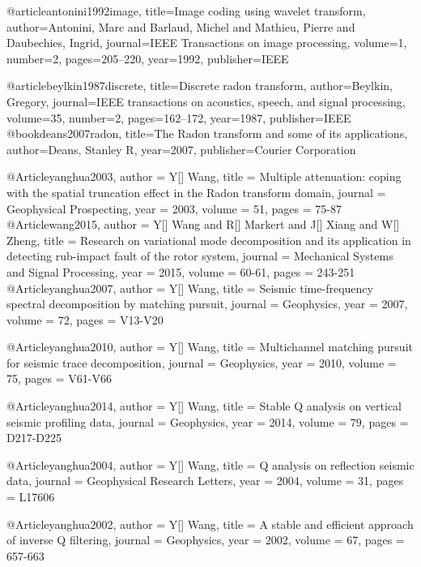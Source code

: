 @article{antonini1992image,
  title={Image coding using wavelet transform},
  author={Antonini, Marc and Barlaud, Michel and Mathieu, Pierre and Daubechies, Ingrid},
  journal={IEEE Transactions on image processing},
  volume={1},
  number={2},
  pages={205--220},
  year={1992},
  publisher={IEEE}
}

@article{beylkin1987discrete,
  title={Discrete radon transform},
  author={Beylkin, Gregory},
  journal={IEEE transactions on acoustics, speech, and signal processing},
  volume={35},
  number={2},
  pages={162--172},
  year={1987},
  publisher={IEEE}
}
@book{deans2007radon,
  title={The Radon transform and some of its applications},
  author={Deans, Stanley R},
  year={2007},
  publisher={Courier Corporation}
}

@Article{yanghua2003,
  author = 	 {Y[] Wang},
  title = 	 {Multiple attenuation: coping with the spatial truncation effect in the Radon transform domain},
  journal = 	 {Geophysical Prospecting},
  year = 	 2003,
  volume =	 51,
  pages =	 {75-87}
}
@Article{wang2015,
  author = 	 {Y[] Wang and R[] Markert and J[] Xiang and W[] Zheng},
  title = 	 {Research on variational mode decomposition and its application in detecting rub-impact fault of the rotor system},
  journal = 	 {Mechanical Systems and Signal Processing},
  year = 	 2015,
  volume =	 60-61,
  pages =	 {243-251}
}
@Article{yanghua2007,
  author = 	 {Y[] Wang},
  title = 	 {Seismic time-frequency spectral decomposition by matching pursuit},
  journal = 	 {Geophysics},
  year = 	 2007,
  volume =	 72,
  pages =	 {V13-V20}
}

@Article{yanghua2010,
  author = 	 {Y[] Wang},
  title = 	 {Multichannel matching pursuit for seismic trace decomposition},
  journal = 	 {Geophysics},
  year = 	 2010,
  volume =	 75,
  pages =	 {V61-V66}
}

@Article{yanghua2014,
  author = 	 {Y[] Wang},
  title = 	 {Stable Q analysis on vertical seismic profiling data},
  journal = 	 {Geophysics},
  year = 	 2014,
  volume =	 79,
  pages =	 {D217-D225}
}

@Article{yanghua2004,
  author = 	 {Y[] Wang},
  title = 	 {Q analysis on reflection seismic data},
  journal = 	 {Geophysical Research Letters},
  year = 	 2004,
  volume =	 31,
  pages =	 {L17606}
}

@Article{yanghua2002,
  author = 	 {Y[] Wang},
  title = 	 {A stable and efficient approach of inverse Q filtering},
  journal = 	 {Geophysics},
  year = 	 2002,
  volume = 67,
  pages =	 {657-663}
}

